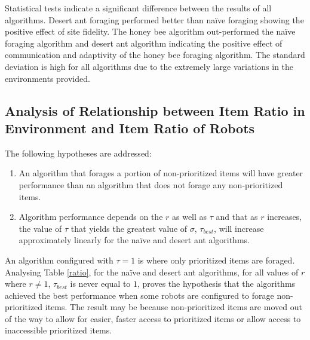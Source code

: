Statistical tests indicate a significant difference between the results of all algorithms. Desert ant foraging performed better than na\"ive foraging showing the positive effect of site fidelity. The honey bee algorithm out-performed the na\"ive foraging algorithm and desert ant algorithm indicating the positive effect of communication and adaptivity of the honey bee foraging algorithm. The standard deviation is high for all algorithms due to the extremely large variations in the environments provided.

\subsection{Analysis of Relationship between Item Ratio in Environment and Item Ratio of Robots}
\label{relationship}

The following hypotheses are addressed:
\begin{enumerate}
\item An algorithm that forages a portion of non-prioritized items will have greater performance than an algorithm that does not forage any non-prioritized items.
\item Algorithm performance depends on the $r$ as well as $\tau$ and that as $r$ increases, the value of $\tau$ that yields the greatest value of $\sigma$, $\tau_{best}$, will increase approximately linearly for the na\"ive and desert ant algorithms.
\end{enumerate}

An algorithm configured with $\tau=1$ is where only prioritized items are foraged. Analysing Table \ref{ratio}, for the na\"ive and desert ant algorithms, for all values of $r$ where $r \neq 1$, $\tau_{best}$ is never equal to $1$, proves the hypothesis that the algorithms achieved the best performance when some robots are configured to forage non-prioritized items. The result may be because non-prioritized items are moved out of the way to allow for easier, faster access to prioritized items or allow access to inaccessible prioritized items.


